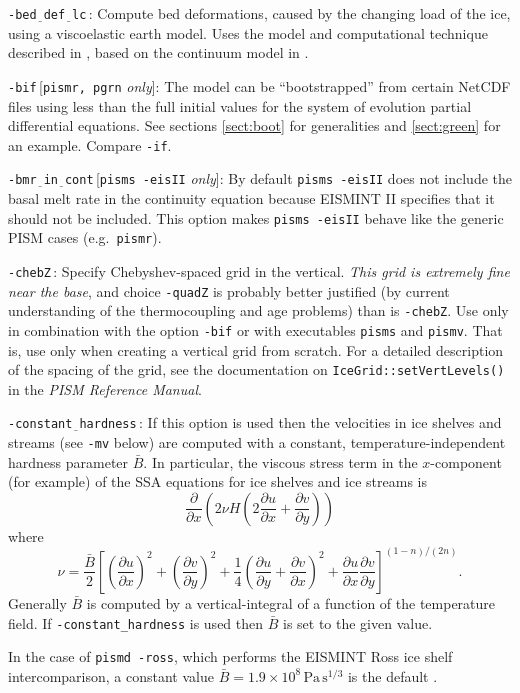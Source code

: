 \documentclass[11pt,final]{amsart}
\newcommand{\ddx}[1]{\ensuremath{\frac{\partial #1}{\partial x}}}
\newcommand{\ddy}[1]{\ensuremath{\frac{\partial #1}{\partial y}}}
\newcommand{\rawopt}[1]{\vspace{1mm}\noindent \large\texttt{-#1}\normalsize}
\newcommand{\opt}[1]{\rawopt{#1}\,:\quad}
\newcommand{\optrestrict}[2]{\rawopt{#1}\,[\texttt{#2} \textsl{only}]:\quad}
\newcommand{\und}{$\underline{\,\,\,}$}
\begin{document}
\opt{bed\und def\und lc} Compute bed deformations, caused by the changing load of the ice, using a viscoelastic earth model.  Uses the model and computational technique described in \cite{BLKfastearth}, based on the continuum model in \cite{LingleClark}.

\optrestrict{bif}{pismr, pgrn}  The model can be ``bootstrapped'' from certain NetCDF files using less than the full initial values for the system of evolution partial differential equations.  See sections \ref{sect:boot} for generalities and \ref{sect:green} for an example.  Compare \verb|-if|.

\optrestrict{bmr\und in\und cont}{pisms -eisII}  By default \verb|pisms -eisII| does not include the basal melt rate in the continuity equation because EISMINT II specifies that it should not be included.  This option makes \verb|pisms -eisII| behave like the generic PISM cases (e.g.~\verb|pismr|).

\opt{chebZ}  Specify Chebyshev-spaced grid in the vertical.  \emph{This grid is extremely fine near the base}, and choice \verb|-quadZ| is probably better justified (by current understanding of the thermocoupling and age problems) than is \verb|-chebZ|.  Use only in combination with the option \verb|-bif| or with executables \verb|pisms| and \verb|pismv|.  That is, use only when creating a vertical grid from scratch.  For a detailed description of the spacing of the grid, see the documentation on \verb|IceGrid::setVertLevels()| in the \emph{PISM Reference Manual}.

\opt{constant\und hardness}  If this option is used then the velocities in ice shelves and streams (see \verb|-mv| below) are computed with a constant, temperature-independent hardness parameter $\bar B$.  In particular, the viscous stress term in the $x$-component (for example) of the SSA equations for ice shelves and ice streams is
	$$\ddx{}\left(2\nu H\left(2\ddx{u} + \ddy{v}\right)\right)$$
where 
	$$\nu = \frac{\bar B}{2} \left[\left(\ddx{u}\right)^2 + \left(\ddy{v}\right)^2 +
  \frac{1}{4} \left(\ddy{u} + \ddx{v}\right)^2 + \ddx{u}\ddy{v}\right]^{(1-n)/(2n)}.$$
Generally $\bar B$ is computed by a vertical-integral of a function of the temperature field.  If \verb|-constant_hardness| is used then $\bar B$ is set to the given value.

In the case of \verb|pismd -ross|, which performs the EISMINT Ross ice shelf intercomparison, a constant value $\bar B = 1.9 \times 10^8 \, \text{Pa}\, \text{s}^{1/3}$ is the default \cite{MacAyealetal}.
\end{document}
